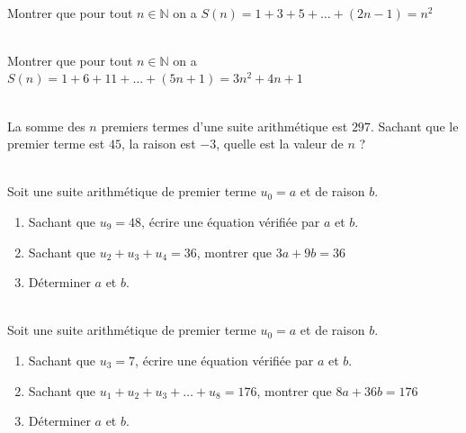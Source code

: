 \documentclass[main.tex]{subfiles}
\begin{document}
\begin{exercise} \label{chapter05:exercise:suites39} \hfill \\
Montrer que pour tout $n\in\mathbb{N}$ on a $S(n)=1+3+5+\ldots + (2n-1)=n^2$
\end{exercise} 
\begin{exercise} \label{chapter05:exercise:suites40} \hfill \\
	Montrer que pour tout $n\in\mathbb{N}$ on a $S(n)=1+6+11+\ldots + (5n+1)=3n^2+4n+1$%
\end{exercise}
\begin{exercise}  \label{chapter05:exercise:suites41}\hfill \\
	La somme des $n$ premiers termes d'une suite arithmétique est $297$. Sachant que le premier terme est $45$, la raison est $-3$, quelle est la valeur de $n$ ?
\end{exercise} 
\begin{exercise}\label{chapter05:exercise:suites42} \hfill  \\
	Soit une suite arithmétique de premier terme $u_0=a$ et de raison $b$.
	\begin{enumerate}[leftmargin=*,label=\arabic*)]
		\item Sachant que $u_9=48$, écrire une équation vérifiée par $a$ et $b$.
		\item Sachant que  $u_2+u_3+u_4=36$, montrer que $3a+9b =36$
		\item Déterminer $a$ et $b$.
	\end{enumerate}
\end{exercise} 
\begin{exercise} \label{chapter05:exercise:suites43}\hfill  \\
Soit une suite arithmétique de premier terme $u_0=a$ et de raison $b$.
	\begin{enumerate}[leftmargin=*,label=\arabic*)]
	\item Sachant que $u_3=7$, écrire une équation vérifiée par $a$ et $b$.
	\item Sachant que $u_1 + u_2 + u_3+\ldots + u_8=176$, montrer que $8a+36b=176$
	\item Déterminer $a$ et $b$.
\end{enumerate}
\end{exercise}
%	 
\newpage  
\end{document}
